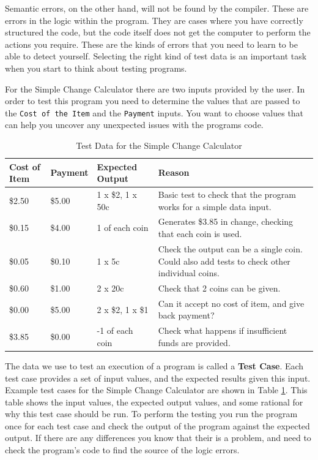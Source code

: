 Semantic errors, on the other hand, will not be found by the compiler. These are errors in the logic within the program. They are cases where you have correctly structured the code, but the code itself does not get the computer to perform the actions you require. These are the kinds of errors that you need to learn to be able to detect yourself. Selecting the right kind of test data is an important task when you start to think about testing programs.

For the Simple Change Calculator there are two inputs provided by the user. In order to test this program you need to determine the values that are passed to the \texttt{Cost of the Item} and the \texttt{Payment} inputs. You want to choose values that can help you uncover any unexpected issues with the programs code.

\begin{table}
\begin{tabular}{|l|l|l|p{7cm}|}
  \hline
  \textbf{Cost of Item}  & \textbf{Payment} & \textbf{Expected Output}  &   \textbf{Reason} \\
  \hline
  \$2.50 & \$5.00 & 1 x \$2, 1 x 50c & Basic test to check that the program works for a simple data input. \\
  \hline
  \$0.15 & \$4.00 & 1 of each coin & Generates \$3.85 in change, checking that each coin is used. \\
  \hline
  \$0.05 & \$0.10 & 1 x 5c & Check the output can be a single coin. Could also add tests to check other individual coins. \\
  \hline
  \$0.60 & \$1.00 & 2 x 20c & Check that 2 coins can be given. \\
  \hline
  \$0.00 & \$5.00 & 2 x \$2, 1 x \$1 & Can it accept no cost of item, and give back payment? \\
  \hline
  \$3.85 & \$0.00 & -1 of each coin & Check what happens if insufficient funds are provided. \\
  \hline
\end{tabular}
\caption{Test Data for the Simple Change Calculator}
\label{tab:simple_change_test_data}
\end{table}

The data we use to test an execution of a program is called a \textbf{Test Case}. Each test case provides a set of input values, and the expected results given this input. Example test cases for the Simple Change Calculator are shown in Table \ref{tab:simple_change_test_data}. This table shows the input values, the expected output values, and some rational for why this test case should be run. To perform the testing you run the program once for each test case and check the output of the program against the expected output. If there are any differences you know that their is a problem, and need to check the program's code to find the source of the logic errors.






